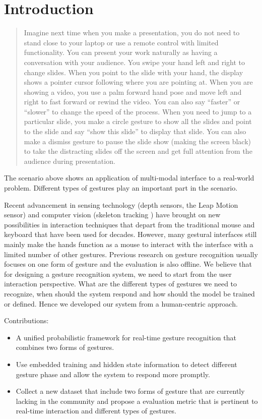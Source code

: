 \documentclass[conference]{IEEEtran}
\begin{document}
\section{Introduction}
\begin{quotation}
Imagine next time when you make a presentation, you do not need to stand close
to your laptop or use a remote control with limited functionality. You can
present your work naturally as having a conversation with your audience. You
swipe your hand left and right to change slides. When you point to the slide
with your hand, the display shows a pointer cursor following where you are
pointing at. When you are showing a video,
you use a palm forward hand pose and move left and right to fast forward or
rewind the video. You can also say ``faster'' or ``slower'' to change the speed
of the process. When you need to jump to a particular slide, you make a circle
gesture to show all the slides and point to the slide and say ``show this
slide'' to display that slide. You can also make a dismiss gesture to pause the
slide show (making the screen black) to take the distracting slides off the
screen and get full attention from the audience during presentation.
\end{quotation}

The scenario above shows an application of multi-modal interface to a real-world
problem. Different types of gestures play an important part in the scenario.

Recent advancement in sensing technology (depth sensors, the Leap Motion sensor)
and computer vision (skeleton tracking \cite{shotton13}) have brought on new
possibilities in interaction techniques that depart from the traditional mouse
and keyboard that have been used for decades. However, many gestural interfaces
still mainly make the hands function as a mouse to interact with the interface
with a limited number of other gestures. Previous research on gesture
recognition usually focuses on one form of gesture and the evaluation is also
offline. We believe that for designing a gesture recognition system, we need to
start from the user interaction perspective. What are the different types of
gestures we need to recognize, when should the system respond and how should the
model be trained or defined. Hence we developed our system from a human-centric
approach.

Contributions:
\begin{itemize}
  \item A unified probabilistic framework for real-time gesture recognition that
  combines two forms of gestures.
  \item Use embedded training and hidden state information to detect different
  gesture phase and allow the system to respond more promptly.
  \item Collect a new dataset that include two forms of gesture that are
  currently lacking in the community and propose a evaluation metric that is
  pertinent to real-time interaction and different types of gestures.
\end{itemize}
\end{document}
